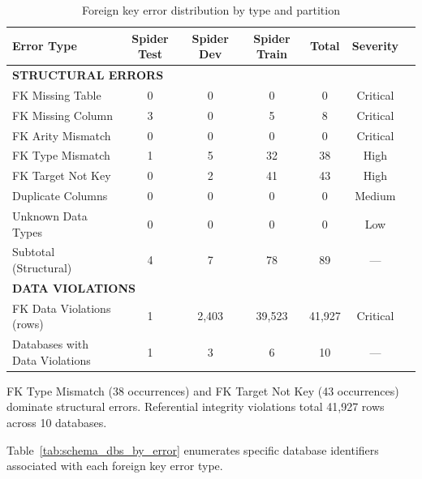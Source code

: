 \documentclass[]{einformatica}
\begin{document}
\begin{table}[ht]
    \caption{Foreign key error distribution by type and partition}
    \label{tab:schema_errors}
    \centering
    \footnotesize
    \begin{tabular}{lcccccc}
        \toprule
        \textbf{Error Type} & \textbf{Spider Test} & \textbf{Spider Dev} & \textbf{Spider Train} & \textbf{Total} & \textbf{Severity} \\
        \midrule
        \multicolumn{6}{l}{\textbf{STRUCTURAL ERRORS}} \\
        FK Missing Table & 0 & 0 & 0 & 0 & Critical \\
        FK Missing Column & 3 & 0 & 5 & 8 & Critical \\
        FK Arity Mismatch & 0 & 0 & 0 & 0 & Critical \\
        FK Type Mismatch & 1 & 5 & 32 & 38 & High \\
        FK Target Not Key & 0 & 2 & 41 & 43 & High \\
        Duplicate Columns & 0 & 0 & 0 & 0 & Medium \\
        Unknown Data Types & 0 & 0 & 0 & 0 & Low \\
        Subtotal (Structural) & 4 & 7 & 78 & 89 & --- \\
        \multicolumn{6}{l}{\textbf{DATA VIOLATIONS}} \\
        FK Data Violations (rows) & 1 & 2,403 & 39,523 & 41,927 & Critical \\
        Databases with Data Violations & 1 & 3 & 6 & 10 & --- \\
        \bottomrule
    \end{tabular}
\end{table}

FK Type Mismatch (38 occurrences) and FK Target Not Key (43 occurrences) dominate structural errors. Referential integrity violations total 41,927 rows across 10 databases.

Table~\ref{tab:schema_dbs_by_error} enumerates specific database identifiers associated with each foreign key error type.
\end{document}
